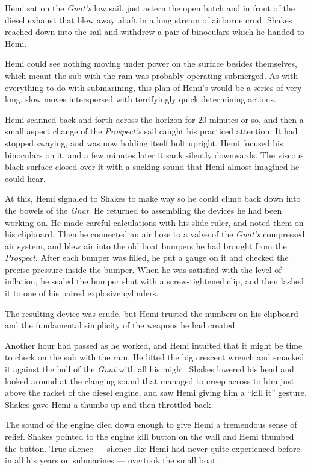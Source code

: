 \documentclass[
]{scrbook}
\begin{document}
Hemi sat on the \emph{Gnat's} low sail, just astern the open hatch and
in front of the diesel exhaust that blew away abaft in a long stream of
airborne crud. Shakes reached down into the sail and withdrew a pair of
binoculars which he handed to Hemi.

Hemi could see nothing moving under power on the surface besides
themselves, which meant the sub with the ram was probably operating
submerged. As with everything to do with submarining, this plan of
Hemi's would be a series of very long, slow moves interspersed with
terrifyingly quick determining actions.

Hemi scanned back and forth across the horizon for 20 minutes or so, and
then a small aspect change of the \emph{Prospect's} sail caught his
practiced attention. It had stopped swaying, and was now holding itself
bolt upright. Hemi focused his binoculars on it, and a few minutes later
it sank silently downwards. The viscous black surface closed over it
with a sucking sound that Hemi almost imagined he could hear.

At this, Hemi signaled to Shakes to make way so he could climb back down
into the bowels of the \emph{Gnat}. He returned to assembling the
devices he had been working on. He made careful calculations with his
slide ruler, and noted them on his clipboard. Then he connected an air
hose to a valve of the \emph{Gnat's} compressed air system, and blew air
into the old boat bumpers he had brought from the \emph{Prospect}. After
each bumper was filled, he put a gauge on it and checked the precise
pressure inside the bumper. When he was satisfied with the level of
inflation, he sealed the bumper shut with a screw-tightened clip, and
then lashed it to one of his paired explosive cylinders.

The resulting device was crude, but Hemi trusted the numbers on his
clipboard and the fundamental simplicity of the weapons he had created.

Another hour had passed as he worked, and Hemi intuited that it might be
time to check on the sub with the ram. He lifted the big crescent wrench
and smacked it against the hull of the \emph{Gnat} with all his might.
Shakes lowered his head and looked around at the clanging sound that
managed to creep across to him just above the racket of the diesel
engine, and saw Hemi giving him a ``kill it'' gesture. Shakes gave Hemi
a thumbs up and then throttled back.

The sound of the engine died down enough to give Hemi a tremendous sense
of relief. Shakes pointed to the engine kill button on the wall and Hemi
thumbed the button. True silence --- silence like Hemi had never quite
experienced before in all his years on submarines --- overtook the small
boat.
\end{document}
